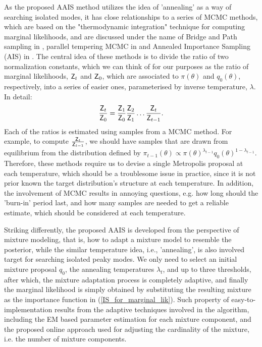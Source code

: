As the proposed AAIS method utilizes the idea of 'annealing' as a
way of searching isolated modes, it has close relationships to a
series of MCMC methods, which are based on the "thermodynamic
integration" technique for computing marginal likelihoods, and are
discussed under the name of Bridge and Path sampling in
\cite{gelman1998simulating}, parallel tempering MCMC in
\cite{gregory2010bayesian,gregory2005bayesian} and Annealed
Importance Sampling (AIS) in \cite{neal2001ais}. The central idea of
these methods is to divide the ratio of two normalization constants,
which we can think of for our purposes as the ratio of marginal
likelihoods, $\textsf{Z}_t$ and $\textsf{Z}_0$, which are associated to
$\pi(\theta)$ and $q_0(\theta)$, respectively, into a series of
easier ones, parameterised by inverse temperature, $\lambda$. In
detail:
\begin{equation}
\frac{\Z_t}{\Z_0}=\frac{\Z_1}{\Z_0}\frac{\Z_2}{\Z_1}\dots\frac{\Z_t}{\Z_{t-1}}.
\end{equation}
Each of the ratios is estimated using samples from a MCMC method.
For example, to compute $\frac{\textsf{Z}_t}{\textsf{Z}_{t-1}}$, we should have
samples that are drawn from equilibrium from the distribution
defined by
$\pi_{t-1}(\theta)\propto\pi(\theta)^{\lambda_{t-1}}q_0(\theta)^{1-\lambda_{t-1}}$.
Therefore, these methods require us to devise a single Metropolis
proposal at each temperature, which should be a troublesome issue in
practice, since it is not prior known the target distribution's
structure at each temperature. In addition, the involvement of MCMC
results in annoying questions, e.g. how long should the 'burn-in'
period last, and how many samples are needed to get a reliable
estimate, which should be considered at each temperature.

Striking differently, the proposed AAIS is developed from the
perspective of mixture modeling, that is, how to adapt a mixture
model to resemble the posterior, while the similar temperature idea,
i.e., 'annealing', is also involved target for searching isolated
peaky modes. We only need to select an initial mixture proposal
$q_0$, the annealing temperatures $\lambda_t$, and up to three
thresholds, after which, the mixture adaptation process is
completely adaptive, and finally the marginal likelihood is simply
obtained by substituting the resulting mixture as the importance
function in (\ref{IS_for_marginal_lik}). Such property of
easy-to-implementation results from the adaptive techniques involved
in the algorithm, including the EM based parameter estimation for
each mixture component, and the proposed online approach used for
adjusting the cardinality of the mixture, i.e. the number of mixture
components.

